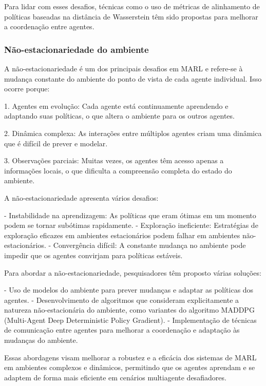Para lidar com esses desafios, técnicas como o uso de métricas de alinhamento de políticas baseadas na distância de Wasserstein têm sido propostas para melhorar a coordenação entre agentes\cite{Li2023RACEIM}.

\subsubsection{Não-estacionariedade do ambiente}
\label{subsubsec:nao_estacionariedade}

A não-estacionariedade é um dos principais desafios em MARL e refere-se à mudança constante do ambiente do ponto de vista de cada agente individual\cite{NiedzikaDomaski2024AnEM,delafuente2024gametheorymultiagentreinforcement}. Isso ocorre porque:

1. Agentes em evolução: Cada agente está continuamente aprendendo e adaptando suas políticas, o que altera o ambiente para os outros agentes\cite{NiedzikaDomaski2024AnEM}.

2. Dinâmica complexa: As interações entre múltiplos agentes criam uma dinâmica que é difícil de prever e modelar\cite{delafuente2024gametheorymultiagentreinforcement}.

3. Observações parciais: Muitas vezes, os agentes têm acesso apenas a informações locais, o que dificulta a compreensão completa do estado do ambiente\cite{NiedzikaDomaski2024AnEM}.

A não-estacionariedade apresenta vários desafios:

- Instabilidade na aprendizagem: As políticas que eram ótimas em um momento podem se tornar subótimas rapidamente.
- Exploração ineficiente: Estratégias de exploração eficazes em ambientes estacionários podem falhar em ambientes não-estacionários.
- Convergência difícil: A constante mudança no ambiente pode impedir que os agentes convirjam para políticas estáveis.

Para abordar a não-estacionariedade, pesquisadores têm proposto várias soluções:

- Uso de modelos do ambiente para prever mudanças e adaptar as políticas dos agentes\cite{NiedzikaDomaski2024AnEM}.
- Desenvolvimento de algoritmos que consideram explicitamente a natureza não-estacionária do ambiente, como variantes do algoritmo MADDPG (Multi-Agent Deep Deterministic Policy Gradient)\cite{Li2023RACEIM}.
- Implementação de técnicas de comunicação entre agentes para melhorar a coordenação e adaptação às mudanças do ambiente\cite{Li2023RACEIM}.

Essas abordagens visam melhorar a robustez e a eficácia dos sistemas de MARL em ambientes complexos e dinâmicos, permitindo que os agentes aprendam e se adaptem de forma mais eficiente em cenários multiagente desafiadores.

